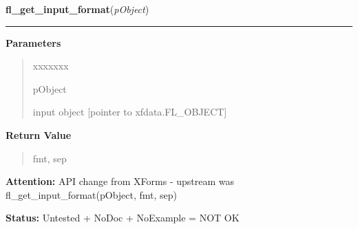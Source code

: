 \hspace{.8\funcindent}\begin{boxedminipage}{\funcwidth}

    \raggedright \textbf{fl\_get\_input\_format}(\textit{pObject})

    \vspace{-1.5ex}

    \rule{\textwidth}{0.5\fboxrule}
\setlength{\parskip}{2ex}
\setlength{\parskip}{1ex}
      \textbf{Parameters}
      \vspace{-1ex}

      \begin{quote}
        \begin{Ventry}{xxxxxxx}

          \item[pObject]

          input object [pointer to xfdata.FL\_OBJECT]

        \end{Ventry}

      \end{quote}

      \textbf{Return Value}
    \vspace{-1ex}

      \begin{quote}
      fmt, sep

      \end{quote}

\textbf{Attention:} API change from XForms - upstream was fl\_get\_input\_format(pObject, fmt, 
sep)



\textbf{Status:} Untested + NoDoc + NoExample = NOT OK



    \end{boxedminipage}

    \label{xformslib:library:fl_get_input}

    \vspace{0.5ex}

